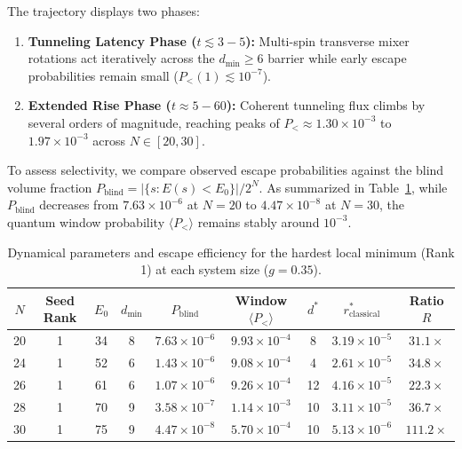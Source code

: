 \documentclass[12pt,a4paper]{report}
\begin{document}
The trajectory displays two phases:
\begin{enumerate}
    \item \textbf{Tunneling Latency Phase ($t \lesssim 3 - 5$):} Multi-spin transverse mixer rotations act iteratively across the $d_{\min} \ge 6$ barrier while early escape probabilities remain small ($P_<(1) \lesssim 10^{-7}$).
    \item \textbf{Extended Rise Phase ($t \approx 5 - 60$):} Coherent tunneling flux climbs by several orders of magnitude, reaching peaks of $P_< \approx 1.30 \times 10^{-3}$ to $1.97 \times 10^{-3}$ across $N \in [20, 30]$.
\end{enumerate}

To assess selectivity, we compare observed escape probabilities against the blind volume fraction $P_{\mathrm{blind}} = |\{s : E(s) < E_0\}| / 2^N$. As summarized in Table~\ref{tab:hardest_seeds}, while $P_{\mathrm{blind}}$ decreases from $7.63 \times 10^{-6}$ at $N = 20$ to $4.47 \times 10^{-8}$ at $N = 30$, the quantum window probability $\langle P_< \rangle$ remains stably around $10^{-3}$.

\begin{table}[htbp]
    \centering
    \caption{Dynamical parameters and escape efficiency for the hardest local minimum (Rank 1) at each system size ($g = 0.35$).}
    \label{tab:hardest_seeds}
    \begin{tabular}{ccccccccc}
        \toprule
        $N$ & Seed Rank & $E_0$ & $d_{\min}$ & $P_{\mathrm{blind}}$ & Window $\langle P_< \rangle$ & $d^*$ & $r_{\mathrm{classical}}^*$ & Ratio $R$ \\
        \midrule
        20 & 1 & 34 & 8 & $7.63 \times 10^{-6}$ & $9.93 \times 10^{-4}$ & 8  & $3.19 \times 10^{-5}$ & $\mathbf{31.1\times}$ \\
        24 & 1 & 52 & 6 & $1.43 \times 10^{-6}$ & $9.08 \times 10^{-4}$ & 4  & $2.61 \times 10^{-5}$ & $\mathbf{34.8\times}$ \\
        26 & 1 & 61 & 6 & $1.07 \times 10^{-6}$ & $9.26 \times 10^{-4}$ & 12 & $4.16 \times 10^{-5}$ & $\mathbf{22.3\times}$ \\
        28 & 1 & 70 & 9 & $3.58 \times 10^{-7}$ & $1.14 \times 10^{-3}$ & 10 & $3.11 \times 10^{-5}$ & $\mathbf{36.7\times}$ \\
        30 & 1 & 75 & 9 & $4.47 \times 10^{-8}$ & $5.70 \times 10^{-4}$ & 10 & $5.13 \times 10^{-6}$ & $\mathbf{111.2\times}$ \\
        \bottomrule
    \end{tabular}
\end{table}
\end{document}

